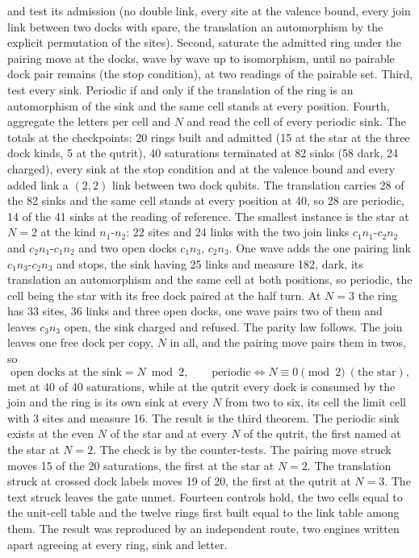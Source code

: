 \begin{chproof}
and test its admission (no double link, every site at the valence bound, every join link between two docks with spare, the translation an automorphism by the explicit permutation of the sites). Second, saturate the admitted ring under the pairing move at the docks, wave by wave up to isomorphism, until no pairable dock pair remains (the stop condition), at two readings of the pairable set. Third, test every sink. Periodic if and only if the translation of the ring is an automorphism of the sink and the same cell stands at every position. Fourth, aggregate the letters per cell and $N$ and read the cell of every periodic sink. The totals at the checkpoints: 20 rings built and admitted (15 at the star at the three dock kinds, 5 at the qutrit), 40 saturations terminated at 82 sinks (58 dark, 24 charged), every sink at the stop condition and at the valence bound and every added link a $(2,2)$ link between two dock qubits. The translation carries 28 of the 82 sinks and the same cell stands at every position at 40, so 28 are periodic, 14 of the 41 sinks at the reading of reference. The smallest instance is the star at $N = 2$ at the kind $n_1$-$n_2$: 22 sites and 24 links with the two join links $c_1 n_1$-$c_2 n_2$ and $c_2 n_1$-$c_1 n_2$ and two open docks $c_1 n_3$, $c_2 n_3$. One wave adds the one pairing link $c_1 n_3$-$c_2 n_3$ and stops, the sink having 25 links and measure 182, dark, its translation an automorphism and the same cell at both positions, so periodic, the cell being the star with its free dock paired at the half turn. At $N = 3$ the ring has 33 sites, 36 links and three open docks, one wave pairs two of them and leaves $c_3 n_3$ open, the sink charged and refused. The parity law follows. The join leaves one free dock per copy, $N$ in all, and the pairing move pairs them in twos, so
\begin{equation}
\text{open docks at the sink} = N \bmod 2, \qquad \text{periodic} \iff N \equiv 0 \pmod 2 \ (\text{the star}),
\end{equation}
met at 40 of 40 saturations, while at the qutrit every dock is consumed by the join and the ring is its own sink at every $N$ from two to six, its cell the limit cell with 3 sites and measure 16. The result is the third theorem. The periodic sink exists at the even $N$ of the star and at every $N$ of the qutrit, the first named at the star at $N = 2$.
The check is by the counter-tests. The pairing move struck moves 15 of the 20 saturations, the first at the star at $N = 2$. The translation struck at crossed dock labels moves 19 of 20, the first at the qutrit at $N = 3$. The text struck leaves the gate unmet. Fourteen controls hold, the two cells equal to the unit-cell table and the twelve rings first built equal to the link table among them.
The result was reproduced by an independent route, two engines written apart agreeing at every ring, sink and letter.
\end{chproof}

